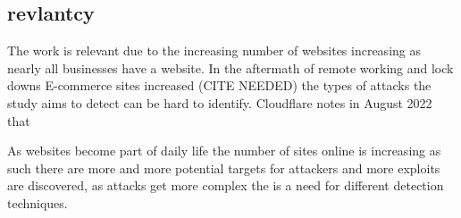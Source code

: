 \subsection{revlantcy}
The work is relevant due to the increasing number of websites increasing as nearly all businesses have a website. In the aftermath of remote working and lock downs E-commerce sites increased (CITE NEEDED) the types of attacks the study aims to detect can be hard to identify. Cloudflare notes in August  2022 that 


As websites become part of daily life the number of sites online is increasing as such there are more and more potential targets for attackers and more exploits are discovered, as attacks get more complex the is a need for different detection techniques.



